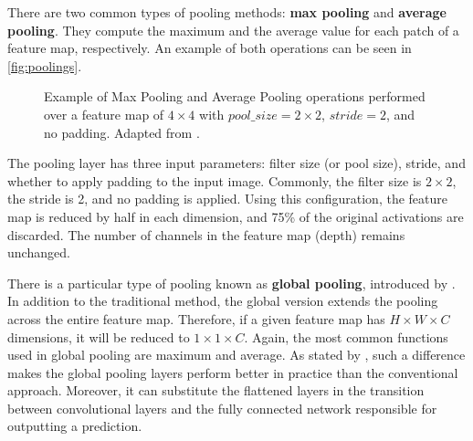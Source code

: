 There are two common types of pooling methods: \textbf{max pooling} and \textbf{average pooling}. They compute the maximum and the average value for each patch of a feature map, respectively. An example of both operations can be seen in \autoref{fig:poolings}.

\begin{figure}[tb]
\centering
{}
\hfill
{}    
\caption{Example of Max Pooling and Average Pooling operations performed over a feature map of $4 \times 4$ with $pool\_size=2 \times 2$, $stride=2$, and no padding. Adapted from \citep{guissousallaeddine2019}.}
\label{fig:poolings}
\end{figure}

The pooling layer has three input parameters: filter size (or pool size), stride, and whether to apply padding to the input image. Commonly, the filter size is $2 \times 2$, the stride is 2, and no padding is applied. Using this configuration, the feature map is reduced by half in each dimension, and 75\% of the original activations are discarded. The number of channels in the feature map (depth) remains unchanged.

There is a particular type of pooling known as \textbf{global pooling}, introduced by \cite{lin2013network}. In addition to the traditional method, the global version extends the pooling across the entire feature map. Therefore, if a given feature map has $H \times W \times C$ dimensions, it will be reduced to $1 \times 1 \times C$. Again, the most common functions used in global pooling are maximum and average. As stated by \cite{zhou2016learning}, such a difference makes the global pooling layers perform better in practice than the conventional approach. Moreover, it can substitute the flattened layers in the transition between convolutional layers and the fully connected network responsible for outputting a prediction.

